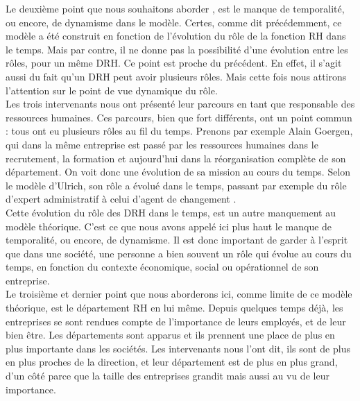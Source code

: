 
Le deuxième point que nous souhaitons aborder %
, est le manque de temporalité, ou encore, de dynamisme dans le modèle. Certes, comme dit précédemment, ce modèle a été construit en fonction de l'évolution du rôle de la fonction RH dans le temps. Mais  par contre, il ne donne pas la possibilité d'une évolution entre les rôles, pour un même DRH. Ce point est proche du précédent. En effet, il s'agit aussi du fait qu'un DRH peut avoir plusieurs rôles. Mais cette fois nous attirons l'attention sur le point de vue dynamique du rôle. \\ %

Les trois intervenants nous ont présenté leur parcours en tant que responsable des ressources humaines. Ces parcours, bien que fort différents, ont un point commun : tous ont eu plusieurs rôles au fil du temps. Prenons par exemple Alain Goergen, qui dans la même entreprise est passé par les ressources humaines dans le recrutement, la formation et aujourd'hui dans la réorganisation complète de son département. On voit donc une évolution de sa mission au cours du temps. Selon le modèle d'Ulrich, son rôle a évolué dans le temps, passant par exemple du rôle d'\og expert administratif \fg{} à celui d'\og agent de changement \fg{}. \\ %

Cette évolution du rôle des DRH dans le temps, est un autre manquement au modèle théorique. C'est ce que nous avons appelé ici plus haut le manque de temporalité, ou encore, de dynamisme. Il est donc important de garder à l'esprit que dans une société, une personne a bien souvent un rôle qui évolue au cours du temps, en fonction du contexte économique, social ou opérationnel de son entreprise. \\ %



Le troisième et dernier point que nous aborderons ici, comme limite de ce modèle théorique, est le département RH en lui même. Depuis quelques temps déjà, les entreprises se sont rendues compte de l'importance de leurs employés, et de leur bien être. Les départements sont apparus et ils prennent une place de plus en plus importante dans les sociétés. Les intervenants nous l'ont dit, ils sont de plus en plus proches de la direction, et leur département est de plus en plus grand, d'un côté parce que la taille des entreprises grandit mais aussi au vu de leur importance. \\ %

